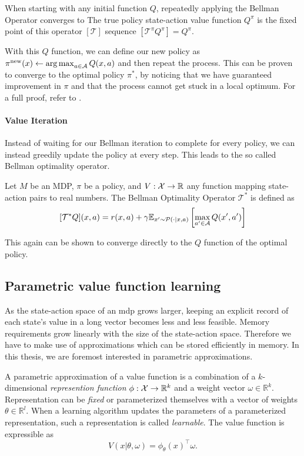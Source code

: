 When starting with any initial function $Q$, repeatedly applying the Bellman Operator converges to 
The true policy state-action value function $Q^\pi$ is the fixed point of this operator $[\mathcal{T}]$ sequence $[\mathcal{T}^\pi Q^\pi] = Q^\pi$.

With this $Q$ function, we can define our new policy as $\pi^\mathrm{new}(x) \leftarrow \operatorname*{arg\,max}_{a\in\mathcal{A}} Q(x,a)$ and then repeat the process.
This can be proven to converge to the optimal policy $\pi^*$, by noticing that we have guaranteed improvement in $\pi$ and that the process cannot get stuck in a local optimum.
For a full proof, refer to \textcite{farahmand2021}.

\paragraph{Value Iteration}

Instead of waiting for our Bellman iteration to complete for every policy, we can instead greedily update the policy at every step.
This leads to the so called Bellman optimality operator.

\begin{definition}
    Let $M$ be an MDP, $\pi$ be a policy, and $V: \mathcal{X} \rightarrow \mathbb{R}$ any function mapping state-action pairs to real numbers.
    The Bellman Optimality Operator $\mathcal{T}^*$ is defined as
    $$[\mathcal{T}^* Q](x,a) = r(x,a) + \gamma \mathbb{E}_{x'\sim \mathcal{P}(\cdot|x,a)}\left[\max_{a' \in \mathcal{A}}Q(x',a')\right]$$
\end{definition}

This again can be shown to converge directly to the $Q$ function of the optimal policy.

\subsection{Parametric value function learning}

As the state-action space of an \ac{mdp} grows larger, keeping an explicit record of each state's value in a long vector becomes less and less feasible.
Memory requirements grow linearly with the size of the state-action space.
Therefore we have to make use of approximations which can be stored efficiently in memory.
In this thesis, we are foremost interested in parametric approximations.

\begin{definition}
    A parametric approximation of a value function is a combination of a $k$-dimensional \emph{represention function} $\phi: \mathcal{X} \rightarrow \mathbb{R}^k$ and a weight vector $\omega \in \mathbb{R}^k$.
    Representation can be \emph{fixed} or parameterized themselves with a vector of weights $\theta \in \mathbb{R}^l$.
    When a learning algorithm updates the parameters of a parameterized representation, such a representation is called \emph{learnable}.
    The value function is expressible as
    $$V(x|\theta,\omega) = \phi_\theta(x)^\top \omega.$$
\end{definition}

